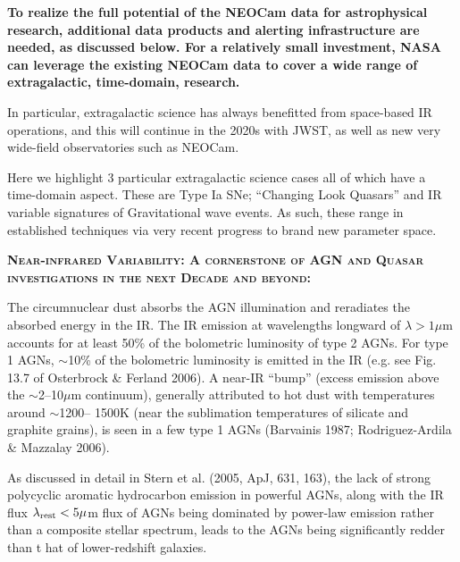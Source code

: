\documentclass[12pt]{article}
\begin{document}
\smallskip
\smallskip
\noindent
{\bf To realize the full potential of the NEOCam data for astrophysical research, additional data products and alerting infrastructure are needed, as discussed below. For a relatively small investment, NASA can leverage the existing NEOCam data to cover a wide range of extragalactic, time-domain, research.}


\smallskip
\smallskip
\noindent
In particular, extragalactic science has always benefitted from space-based IR operations, and this will continue in the 2020s with JWST, as well as new very wide-field observatories such as NEOCam. 


Here we highlight 3 particular extragalactic science cases all of which have a time-domain aspect. These are Type Ia SNe; ``Changing Look Quasars'' and IR variable signatures of Gravitational wave events. As such, these range in established techniques via very recent progress to brand new parameter space. 


%

\smallskip
\smallskip
\noindent

\smallskip
\smallskip
\noindent
\textbf{\textsc{Near-infrared Variability: A cornerstone of AGN and Quasar investigations in the next Decade and beyond:}} 

\smallskip
\smallskip
\noindent

The circumnuclear dust absorbs the AGN illumination and reradiates the absorbed energy in the IR. The IR emission at wavelengths longward of $\lambda > 1 \mu$m accounts for at least 50\% of the bolometric luminosity of type 2 AGNs. For type 1 AGNs, $\sim$10\% of the bolometric luminosity is emitted in the IR (e.g. see Fig. 13.7 of Osterbrock \& Ferland 2006). A near-IR ``bump'' (excess emission above the $\sim$2–10$\mu$m continuum), generally attributed to hot dust with temperatures around $\sim$1200– 1500K (near the sublimation temperatures of silicate and graphite grains), is seen in a few type 1 AGNs (Barvainis 1987; Rodriguez-Ardila \& Mazzalay 2006).

As discussed in detail in Stern et al. (2005, ApJ, 631, 163), the lack of strong polycyclic aromatic hydrocarbon emission in powerful AGNs, along with the IR flux $\lambda_{\rm rest} < 5 \mu$m flux of AGNs being dominated by power-law emission rather than a composite stellar spectrum, leads to the  AGNs being significantly redder than t
hat of lower-redshift galaxies. 
\end{document}
